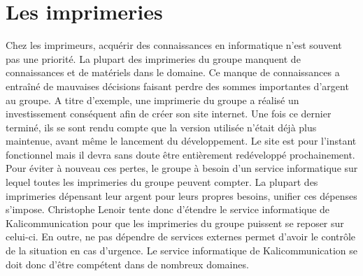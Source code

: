 
\section{Les imprimeries}
Chez les imprimeurs, acquérir des connaissances en informatique n'est souvent pas une priorité. La plupart des imprimeries du groupe manquent de connaissances et de matériels dans le domaine. Ce manque de connaissances a entraîné de mauvaises décisions faisant perdre des sommes importantes d'argent au groupe.\newline
A titre d'exemple, une imprimerie du groupe a réalisé un investissement conséquent afin de créer son site internet. Une fois ce dernier terminé, ils se sont rendu compte que la version utilisée n'était déjà plus maintenue, avant même le lancement du développement. Le site est pour l'instant fonctionnel mais il devra sans doute être entièrement redéveloppé prochainement.\newline
Pour éviter à nouveau ces pertes, le groupe à besoin d'un service informatique sur lequel toutes les imprimeries du groupe peuvent compter. La plupart des imprimeries dépensant leur argent pour leurs propres besoins, unifier ces dépenses s'impose. Christophe Lenoir tente donc d'étendre le service informatique de Kalicommunication pour que les imprimeries du groupe puissent se reposer sur celui-ci. En outre, ne pas dépendre de services externes permet d'avoir le contrôle de la situation en cas d'urgence. Le service informatique de Kalicommunication se doit donc d'être compétent dans de nombreux domaines.

